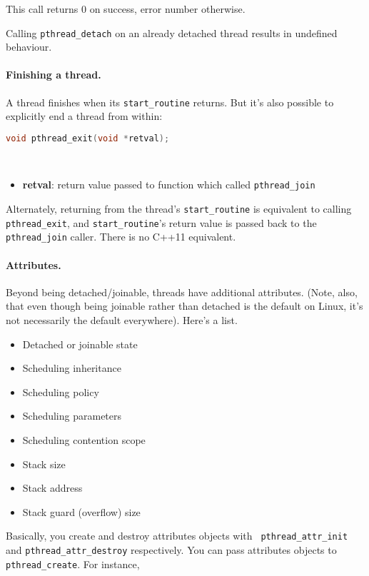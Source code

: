 This call returns 0 on success, error number otherwise.

Calling {\tt pthread\_detach} on an already detached thread results in undefined
behaviour.

\paragraph{Finishing a thread.} A thread finishes when its {\tt start\_routine}
returns. But it's also possible to explicitly end a thread from within:

\begin{lstlisting}[language=C]
void pthread_exit(void *retval);
\end{lstlisting}
~\vspace*{-3em}
\begin{itemize}
\item  {\bf retval}: return value passed to function which called {\tt pthread\_join}
\end{itemize}

Alternately, returning from the thread's {\tt start\_routine} is equivalent
to calling {\tt pthread\_exit}, and {\tt start\_routine}'s return value
is passed back to the {\tt pthread\_join} caller. There is no C++11 equivalent.

\paragraph{Attributes.} Beyond being detached/joinable, threads have additional
attributes. (Note, also, that even though being joinable rather than
detached is the default on Linux, it's not necessarily the default everywhere).
Here's a list.
  \begin{itemize}
    \item Detached or joinable state
    \item Scheduling inheritance
    \item Scheduling policy
    \item Scheduling parameters
    \item Scheduling contention scope
    \item Stack size
    \item Stack address
    \item Stack guard (overflow) size
  \end{itemize}

Basically, you create and destroy attributes objects with {\tt
  pthread\_attr\_init} and {\tt pthread\_attr\_destroy}
respectively. You can pass attributes objects to {\tt
  pthread\_create}. For instance,

